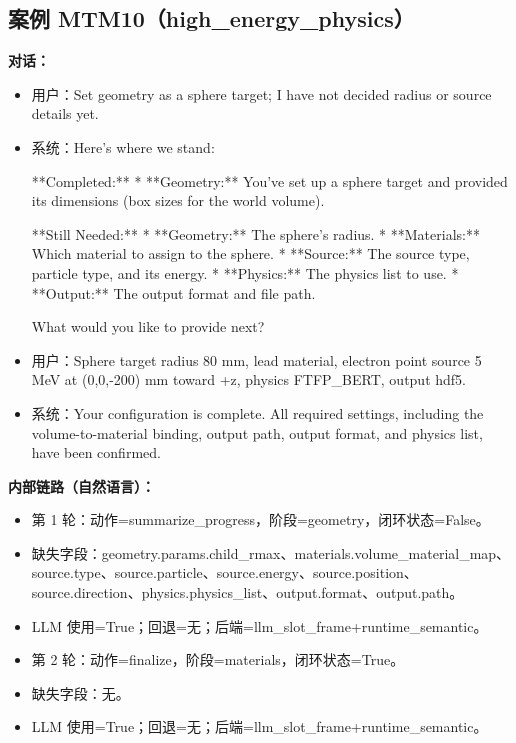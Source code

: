 \documentclass[11pt]{ctexart}
\begin{document}
\subsection{案例 MTM10（high\_energy\_physics）}
\textbf{对话：}
\begin{itemize}
\item 用户：Set geometry as a sphere target; I have not decided radius or source details yet.
\item 系统：Here's where we stand:

**Completed:**
*   **Geometry:** You've set up a sphere target and provided its dimensions (box sizes for the world volume).

**Still Needed:**
*   **Geometry:** The sphere's radius.
*   **Materials:** Which material to assign to the sphere.
*   **Source:** The source type, particle type, and its energy.
*   **Physics:** The physics list to use.
*   **Output:** The output format and file path.

What would you like to provide next?
\item 用户：Sphere target radius 80 mm, lead material, electron point source 5 MeV at (0,0,-200) mm toward +z, physics FTFP\_BERT, output hdf5.
\item 系统：Your configuration is complete. All required settings, including the volume-to-material binding, output path, output format, and physics list, have been confirmed.
\end{itemize}
\textbf{内部链路（自然语言）：}
\begin{itemize}
\item 第 1 轮：动作=summarize\_progress，阶段=geometry，闭环状态=False。
\item 缺失字段：geometry.params.child\_rmax、materials.volume\_material\_map、source.type、source.particle、source.energy、source.position、source.direction、physics.physics\_list、output.format、output.path。
\item LLM 使用=True；回退=无；后端=llm\_slot\_frame+runtime\_semantic。
\item 第 2 轮：动作=finalize，阶段=materials，闭环状态=True。
\item 缺失字段：无。
\item LLM 使用=True；回退=无；后端=llm\_slot\_frame+runtime\_semantic。
\end{itemize}
\end{document}
